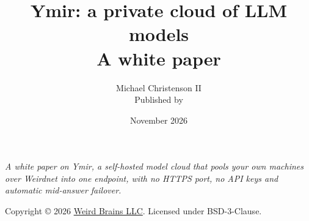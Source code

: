 \documentclass[11pt,letterpaper]{article}
\title{Ymir: a private cloud of LLM models\\[4pt]\large A white paper}
\author{Michael Christenson II\\\small Published by \WB}
\date{November 2026}
\newcommand{\WB}{\href{https://weirdbrains.com}{Weird Brains LLC}}
\begin{document}
\maketitle

\begin{center}
\begin{minipage}{0.88\linewidth}
\small\itshape
A white paper on Ymir, a self-hosted model cloud that pools your own machines over
Weirdnet into one endpoint, with no HTTPS port, no API keys and automatic mid-answer failover.
\end{minipage}
\end{center}

\tableofcontents
\newpage















\nocite{*}

\renewcommand{\refname}{Sources}


\vfill
\noindent\small Copyright \copyright{} 2026 \WB. Licensed under BSD-3-Clause.
\end{document}
